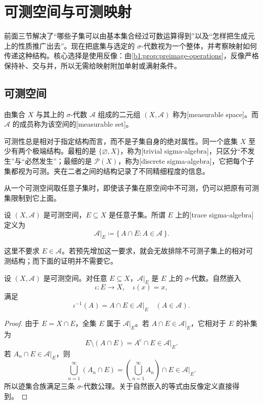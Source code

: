 \section{可测空间与可测映射}
\label{b1:sec:0104}

前面三节解决了“哪些子集可以由基本集合经过可数运算得到”以及“怎样把生成元上的性质推广出去”。现在把底集与选定的 \(\sigma\)-代数视为一个整体，并考察映射如何传递这种结构。核心选择是使用反像：由\cref{b1:prop:preimage-operations}，反像严格保持补、交与并，所以无需给映射附加单射或满射条件。

\subsection{可测空间}
\label{b1:subsec:010401}

\begin{definition}
\label{b1:def:measurable-space}
由集合 \(X\) 与其上的 \(\sigma\)-代数 \(\mathcal A\) 组成的二元组 \((X,\mathcal A)\) 称为[measurable space]。而 \(\mathcal A\) 的成员称为该空间的[measurable set]。
\end{definition}

可测性总是相对于指定结构而言，而不是子集自身的绝对属性。同一个底集 \(X\) 至少有两个极端结构。最粗的是 \(\{\varnothing,X\}\)，称为[trivial sigma-algebra]，只区分“不发生”与“必然发生”；最细的是 \(\mathcal P(X)\)，称为[discrete sigma-algebra]，它把每个子集都视为可测。夹在二者之间的结构记录了不同精细程度的信息。

\ProseParagraphBreak

从一个可测空间取任意子集时，即使该子集在原空间中不可测，仍可以把原有可测集限制到它上面。

\begin{definition}
\label{b1:def:trace-sigma}
设 \((X,\mathcal A)\) 是可测空间，\(E\subseteq X\) 是任意子集。所谓 \(E\) 上的[trace sigma-algebra]定义为
\[
\mathcal A|_E
\coloneqq\{\,A\cap E:A\in\mathcal A\,\}.
\]
\end{definition}

这里不要求 \(E\in\mathcal A\)。若预先增加这一要求，就会无故排除不可测子集上的相对可测结构；而下面的证明并不需要它。

\begin{proposition}
\label{b1:prop:trace-sigma}
设 \((X,\mathcal A)\) 是可测空间。对任意 \(E\subseteq X\)，\(\mathcal A|_E\) 是 \(E\) 上的 \(\sigma\)-代数。自然嵌入
\[
\iota:E\longrightarrow X,
\quad
\iota(x)=x,
\]
满足
\[
\iota^{-1}(A)=A\cap E\in\mathcal A|_E
\quad(A\in\mathcal A).
\]
\end{proposition}
\begin{proof}
由于 \(E=X\cap E\)，全集 \(E\) 属于 \(\mathcal A|_E\)。若 \(A\cap E\in\mathcal A|_E\)，它相对于 \(E\) 的补集为
\[
E\setminus(A\cap E)=A^{\mathrm c}\cap E\in\mathcal A|_E.
\]
若 \(A_n\cap E\in\mathcal A|_E\)，则
\[
\bigcup_{n=1}^{\infty}(A_n\cap E)
=\left(\bigcup_{n=1}^{\infty}A_n\right)\cap E
\in\mathcal A|_E.
\]
所以迹集合族满足三条 \(\sigma\)-代数公理。关于自然嵌入的等式由反像定义直接得到。
\end{proof}

